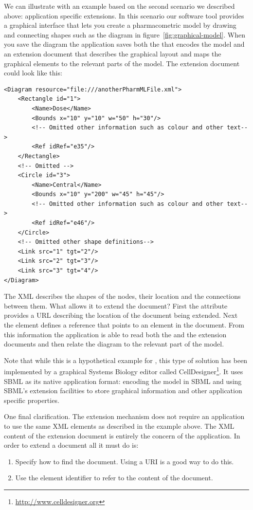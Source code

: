 We can illustrate with an example based on the second scenario we
described above: application specific extensions. In this scenario our
software tool provides a graphical interface that lets you create a
pharmacometric model by drawing and connecting shapes such as the
diagram in figure~\ref{fig:graphical-model}. When you save the diagram
the application saves both the \pharmml that encodes the model and an
extension document that describes the graphical layout and maps the
graphical elements to the relevant parts of the model. The extension
document could look like this:
%
\lstset{language=XML}
\begin{lstlisting}
<Diagram resource="file:///anotherPharmMLFile.xml">
    <Rectangle id="1">
        <Name>Dose</Name>
        <Bounds x="10" y="10" w="50" h="30"/>
        <!-- Omitted other information such as colour and other text-->
        <Ref idRef="e35"/>
    </Rectangle>
    <!-- Omitted -->
    <Circle id="3">
        <Name>Central</Name>
        <Bounds x="10" y="200" w="45" h="45"/>
        <!-- Omitted other information such as colour and other text-->
        <Ref idRef="e46"/>
    </Circle>
    <!-- Omitted other shape definitions-->
    <Link src="1" tgt="2"/>
    <Link src="2" tgt="3"/>
    <Link src="3" tgt="4"/>
</Diagram>
\end{lstlisting}
%
The XML describes the shapes of the nodes, their location and the
connections between them. What allows it to extend the \pharmml document?
First the  attribute provides a URL describing
the location of the \pharmml document being extended. Next the
 element defines a reference that points to an element in
the \pharmml document. From this information the application is able
to read both the \pharmml and the extension documents and then relate
the diagram to the relevant part of the model.

Note that while this is a hypothetical example for \pharmml, this type
of solution has been implemented by a graphical Systems Biology editor
called CellDesigner\footnote{\url{http://www.celldesigner.org}}. It uses SBML
as its native application format: encoding the model in SBML and using
SBML's extension facilities to store graphical information and other
application specific properties.

One final clarification. The extension mechanism does not require an
application to use the same XML elements as described in the example
above. The XML content of the extension document is entirely the
concern of the application. In order to extend a \pharmml document
all it must do is:
\begin{enumerate}
\item Specify how to find the \pharmml document. Using a URI is a good
  way to do this.
\item Use the element identifier to refer to the content of the \pharmml document.
\end{enumerate}

